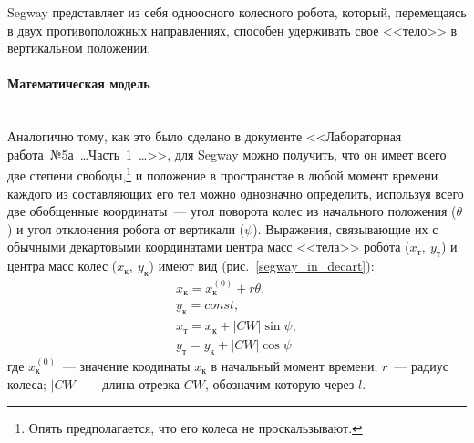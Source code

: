 \documentclass[12pt,a4paper,openany]{extarticle}
\begin{document}
Segway представляет из себя одноосного колесного робота, который, перемещаясь в двух противоположных направлениях, способен удерживать свое <<тело>> в вертикальном положении.

\newpage
\paragraph*{Математическая модель}$\phantom{-}$\\
\hspace*{\parindent}Аналогично тому, как это было сделано в документе <<Лабораторная работа~№5а~\dots Часть~1~\dots>>, для Segway можно получить, что он имеет всего две степени свободы\lefteqn,\footnote{Опять предполагается, что его колеса не проскальзывают.} и положение в пространстве в любой момент времени каждого из составляющих его тел можно однозначно определить, используя всего две обобщенные координаты~--- угол поворота колес из начального положения ($\theta$) и угол отклонения робота от вертикали ($\psi$).   
Выражения, связывающие их с обычными декартовыми координатами центра масс <<тела>> робота ($x_\text{т},\ y_\text{т}$) и центра масс колес ($x_\text{к},\ y_\text{к}$) имеют вид (рис.~\ref{segway_in_decart}):
\begin{gather}
	x_\text{к} = x_\text{к}^{(0)} + r\theta, \label{xk}\\
	y_\text{к} = const,\\
	x_\text{т} = x_\text{к} + |CW|\sin\psi,\\
	y_\text{т} = y_\text{к} + |CW|\cos\psi \label{yt}
\end{gather} 
где $x_\text{к}^{(0)}$~--- значение коодинаты $x_\text{к}$ в начальный момент времени; $r$~--- радиус колеса; $|CW|$~--- длина отрезка $CW$, обозначим которую через $l$.
\end{document}
